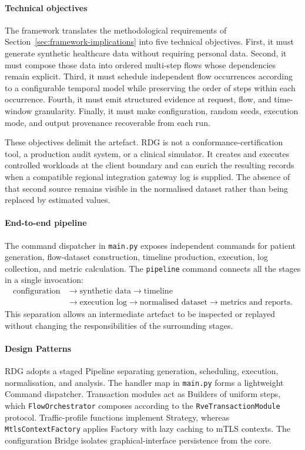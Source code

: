 \paragraph{Technical objectives}
\noindent The framework translates the methodological requirements of
Section~\ref{sec:framework-implications} into five technical objectives. First,
it must generate synthetic healthcare data without requiring personal data.
Second, it must compose those data into ordered multi-step flows whose
dependencies remain explicit. Third, it must schedule independent flow
occurrences according to a configurable temporal model while preserving the
order of steps within each occurrence. Fourth, it must emit structured evidence
at request, flow, and time-window granularity. Finally, it must make
configuration, random seeds, execution mode, and output provenance recoverable
from each run.

\noindent These objectives delimit the artefact. RDG is not a conformance-certification
tool, a production audit system, or a clinical simulator. It creates and
executes controlled workloads at the client boundary and can enrich the
resulting records when a compatible regional integration gateway log is supplied. The absence of
that second source remains visible in the normalised dataset rather than being
replaced by estimated values.

\paragraph{End-to-end pipeline}
\noindent The command dispatcher in \texttt{main.py} exposes independent commands for
patient generation, flow-dataset construction, timeline production, execution,
log collection, and metric calculation. The \texttt{pipeline} command connects
all the stages in a single invocation:
\begin{align*}
  \text{configuration}
  &\rightarrow \text{synthetic data}
  \rightarrow \text{timeline} \\
  &\rightarrow \text{execution log}
  \rightarrow \text{normalised dataset}
  \rightarrow \text{metrics and reports}.
\end{align*}
\noindent This separation allows an intermediate artefact to be inspected or replayed
without changing the responsibilities of the surrounding stages.
\paragraph{Design Patterns}
\noindent RDG adopts a staged Pipeline separating generation, scheduling,
execution, normalisation, and analysis. The handler map in \texttt{main.py}
forms a lightweight Command dispatcher. Transaction modules act as Builders of
uniform steps, which \texttt{Flow\allowbreak Orchestrator} composes according to
the \texttt{RveTransaction\allowbreak Module} protocol. Traffic-profile functions
implement Strategy, whereas \texttt{MtlsContextFactory} applies
Factory with lazy caching to mTLS contexts. The configuration Bridge isolates graphical-interface persistence from the
core.


